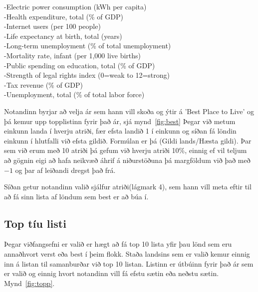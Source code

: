 \documentclass[paper=a4, fontsize=11pt]{scrartcl}
\begin{document}
\vspace{3mm}
\noindent
-Electric power consumption (kWh per capita)\\
-Health expenditure, total (\% of GDP)\\
-Internet users (per 100 people)\\
-Life expectancy at birth, total (years)\\
-Long-term unemployment (\% of total unemployment)\\
-Mortality rate, infant (per 1,000 live births)\\
-Public spending on education, total (\% of GDP)\\
-Strength of legal rights index (0=weak to 12=strong)\\
-Tax revenue (\% of GDP)\\
-Unemployment, total (\% of total labor force)\\
\vspace{3mm}
\par
Notandinn byrjar að velja ár sem hann vill skoða og ýtir á 'Best Place to Live' og þá kemur upp topplistinn fyrir það ár, sjá mynd~\ref{fig:best}
Þegar við metum einkunn landa í hverju atriði, fær efsta landið 1 í einkunn og síðan fá löndin einkunn í hlutfalli við efsta gildið. Formúlan er þá (Gildi lands/Hæsta gildi). Þar sem við erum með 10 atriði þá gefum við hverju atriði 10\%, einnig ef vil teljum að gögnin eigi að hafa neikvæð áhrif á niðurstöðuna þá margföldum við það með $ -1 $ og þar af leiðandi dregst það frá.\par
Síðan getur notandinn valið sjálfur atriði(lágmark 4), sem hann vill meta eftir til að fá sinn lista af löndum sem best er að búa í. 

\newpage

\subsection{Top tíu listi}
Þegar viðfangsefni er valið er hægt að fá top 10 lista yfir þau lönd sem eru annaðhvort verst eða best í þeim flokk. Staða landsins sem er valið kemur einnig inn á listan til samanburðar við top 10 listan. Listinn er útbúinn fyrir það ár sem er valið og einnig hvort notandinn vill fá efstu sætin eða neðstu sætin. Mynd~\ref{fig:topp}.
\\
\end{document}
